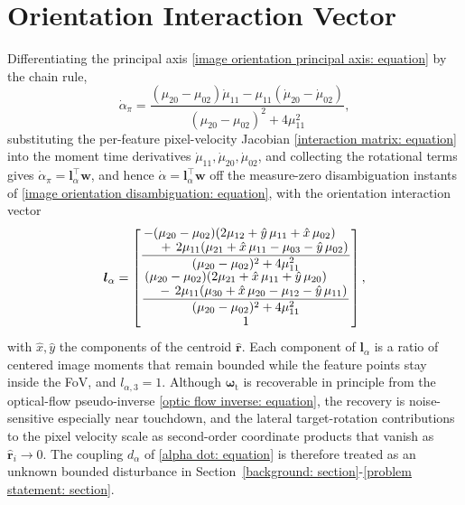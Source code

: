 \documentclass{IEEEtaes}
\theoremstyle{definition}
\theoremstyle{remark}
\begin{document}
\section{Orientation Interaction Vector} \label{l alpha appendix: section}
Differentiating the principal axis \eqref{image orientation principal axis: equation} by the chain rule,
\begin{equation} \label{alpha chain: equation}
    \dot{\alpha}_\pi = \frac{(\mu_{20}-\mu_{02})\dot{\mu}_{11} - \mu_{11}(\dot{\mu}_{20}-\dot{\mu}_{02})}{(\mu_{20}-\mu_{02})^2 + 4\mu_{11}^2},
\end{equation}
substituting the per-feature pixel-velocity Jacobian \eqref{interaction matrix: equation} into the moment time derivatives $\dot{\mu}_{11},\dot{\mu}_{20},\dot{\mu}_{02}$, and collecting the rotational terms gives $\dot{\alpha}_\pi=\boldsymbol{l}_\alpha^\top\boldsymbol{w}$, and hence $\dot{\alpha}=\boldsymbol{l}_\alpha^\top\boldsymbol{w}$ off the measure-zero disambiguation instants of \eqref{image orientation disambiguation: equation}, with the orientation interaction vector
\begin{equation} \label{l alpha: equation}
\boldsymbol{l}_\alpha = \begin{bmatrix}
\dfrac{\splitfrac{-(\mu_{20}-\mu_{02})(2\mu_{12} + \hat{y}\,\mu_{11} + \hat{x}\,\mu_{02})}{+\, 2\mu_{11}(\mu_{21} + \hat{x}\,\mu_{11} - \mu_{03} - \hat{y}\,\mu_{02})}}{(\mu_{20}-\mu_{02})^2 + 4\mu_{11}^2} \\[6pt]
\dfrac{\splitfrac{(\mu_{20}-\mu_{02})(2\mu_{21} + \hat{x}\,\mu_{11} + \hat{y}\,\mu_{20})}{-\, 2\mu_{11}(\mu_{30} + \hat{x}\,\mu_{20} - \mu_{12} - \hat{y}\,\mu_{11})}}{(\mu_{20}-\mu_{02})^2 + 4\mu_{11}^2} \\[6pt]
1
\end{bmatrix},
\end{equation}
with $\hat{x},\hat{y}$ the components of the centroid $\hat{\boldsymbol{r}}$. Each component of $\boldsymbol{l}_\alpha$ is a ratio of centered image moments that remain bounded while the feature points stay inside the FoV, and $l_{\alpha,3}=1$. Although $\boldsymbol{\omega}_\text{t}$ is recoverable in principle from the optical-flow pseudo-inverse \eqref{optic flow inverse: equation}, the recovery is noise-sensitive especially near touchdown, and the lateral target-rotation contributions to the pixel velocity scale as second-order coordinate products that vanish as $\hat{\boldsymbol{r}}_i \to 0$. The coupling $d_\alpha$ of \eqref{alpha dot: equation} is therefore treated as an unknown bounded disturbance in Section~\ref{background: section}-\ref{problem statement: section}.
\end{document}
